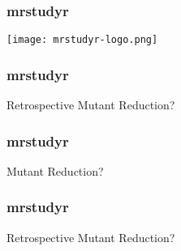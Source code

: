   \begin{frame}
    \frametitle{mrstudyr}
    \centering
    \texttt{[image: mrstudyr-logo.png]}
  \end{frame}

  \begin{frame}
    \frametitle{mrstudyr}
    \centering
    {\HUGE Retrospective Mutant Reduction?}
  \end{frame}

  \begin{frame}
    \frametitle{mrstudyr}
    \centering
    {\HUGE {\textcolor{solarizedBlue}{Retrospective}} Mutant Reduction?}
  \end{frame}

  \begin{frame}
    \frametitle{mrstudyr}
    \centering
    {\HUGE Retrospective {\textcolor{solarizedOrange}{Mutant Reduction}}?}
  \end{frame}
